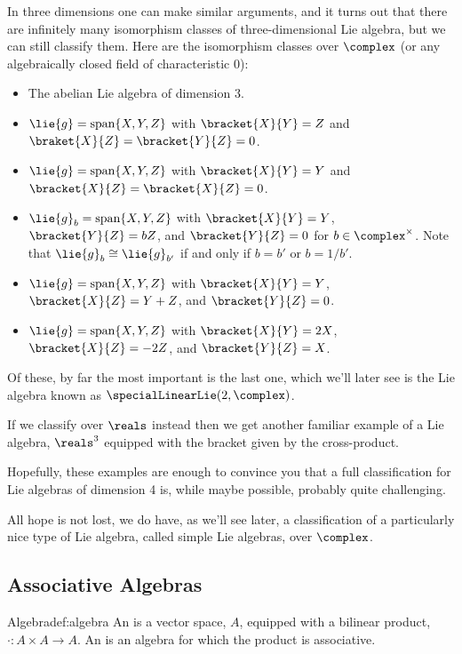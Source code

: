 \documentclass[fleqn]{NotesClass}
\newcommand{\isomorphic}{\cong}
\DeclareMathOperator{\Span}{span}
\begin{document}
    In three dimensions one can make similar arguments, and it turns out that there are infinitely many isomorphism classes of three-dimensional Lie algebra, but we can still classify them.
    Here are the isomorphism classes over \(\complex\) (or any algebraically closed field of characteristic 0):
    \begin{itemize}
        \item The abelian Lie algebra of dimension 3.
        \item \(\lie{g} = \Span\{X, Y, Z\}\) with \(\bracket{X}{Y} = Z\) and \(\braket{X}{Z} = \bracket{Y}{Z} = 0\).
        \item \(\lie{g} = \Span\{X, Y, Z\}\) with \(\bracket{X}{Y} = Y\) and \(\bracket{X}{Z} = \bracket{X}{Z} = 0\).
        \item \(\lie{g}_b = \Span\{X, Y, Z\}\) with \(\bracket{X}{Y} = Y\), \(\bracket{Y}{Z} = bZ\), and \(\bracket{Y}{Z} = 0\) for \(b \in \complex^{\times}\).
        Note that \(\lie{g}_b \isomorphic \lie{g}_{b'}\) if and only if \(b = b'\) or \(b = 1/b'\).
        \item \(\lie{g} = \Span\{X, Y, Z\}\) with \(\bracket{X}{Y} = Y\), \(\bracket{X}{Z} = Y + Z\), and \(\bracket{Y}{Z} = 0\).
        \item \(\lie{g} = \Span\{X, Y, Z\}\) with \(\bracket{X}{Y} = 2X\), \(\bracket{X}{Z} = -2Z\), and \(\bracket{Y}{Z} = X\).
    \end{itemize}
    Of these, by far the most important is the last one, which we'll later see is the Lie algebra known as \(\specialLinearLie(2, \complex)\).
    
    If we classify over \(\reals\) instead then we get another familiar example of a Lie algebra, \(\reals^3\) equipped with the bracket given by the cross-product.
    
    Hopefully, these examples are enough to convince you that a full classification for Lie algebras of dimension 4 is, while maybe possible, probably quite challenging.
    
    All hope is not lost, we do have, as we'll see later, a classification of a particularly nice type of Lie algebra, called simple Lie algebras, over \(\complex\).
    
    \subsection{Associative Algebras}
    \begin{dfn}{Algebra}{def:algebra}
        An  is a vector space, \(A\), equipped with a bilinear product, \(\cdot \colon A \times A \to A\).
        An  is an algebra for which the product is associative.
    \end{dfn}
    
\end{document}
